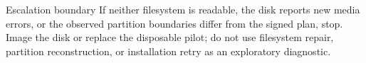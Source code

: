 
\begin{gate}{Escalation boundary}
If neither filesystem is readable, the disk reports new media errors, or the
observed partition boundaries differ from the signed plan, stop. Image the disk
or replace the disposable pilot; do not use filesystem repair, partition
reconstruction, or installation retry as an exploratory diagnostic.
\end{gate}
